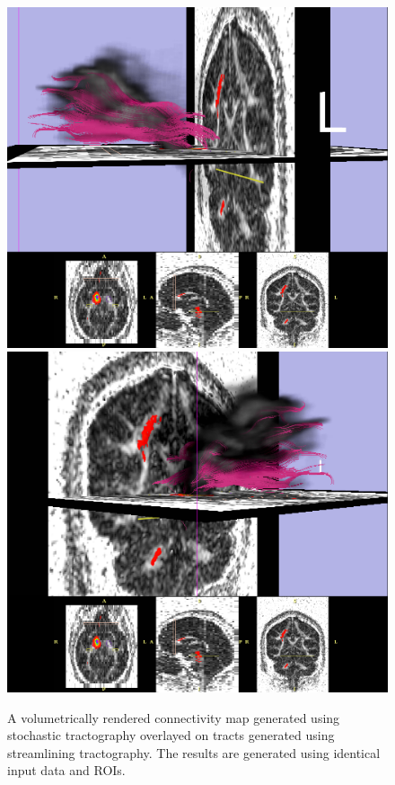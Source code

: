 \begin{figure}
	  \includegraphics[width=0.75\linewidth]
	    {slicer-0015}
	  \includegraphics[width=0.75\linewidth]
	    {slicer-0017}
	\caption{A volumetrically rendered connectivity map generated using stochastic tractography overlayed on tracts generated using streamlining tractography.  The results are generated using identical input data and ROIs.}
	\label{fig:streamlinestochastic}
\end{figure}

